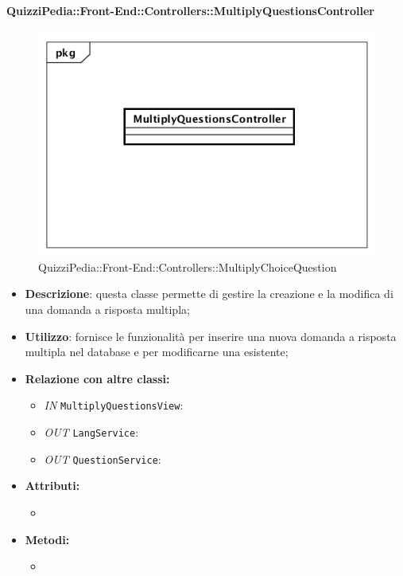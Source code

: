 \paragraph{QuizziPedia::Front-End::Controllers::MultiplyQuestionsController}
\begin{figure}
	\centering
	\includegraphics[scale=0.45]{UML/Classi/Front-End/QuizziPedia_Front-end_Controller_MultiplyQuestionsController.png}
	\caption{QuizziPedia::Front-End::Controllers::MultiplyChoiceQuestion}
\end{figure}
\begin{itemize}
	\item \textbf{Descrizione}: questa classe permette di gestire la creazione e la modifica di una domanda a risposta multipla;
	\item \textbf{Utilizzo}: fornisce le funzionalità per inserire una nuova domanda a risposta multipla nel database e per modificarne una esistente;
	\item \textbf{Relazione con altre classi:}
	\begin{itemize}
		\item \textit{IN} \texttt{MultiplyQuestionsView}:  
		\item \textit{OUT} \texttt{LangService}: 
		\item \textit{OUT} \texttt{QuestionService}:
	\end{itemize}
	\item \textbf{Attributi:}
	\begin{itemize}
		\item 
	\end{itemize}
	\item \textbf{Metodi:}
	\begin{itemize}
		\item 
	\end{itemize}
\end{itemize}

